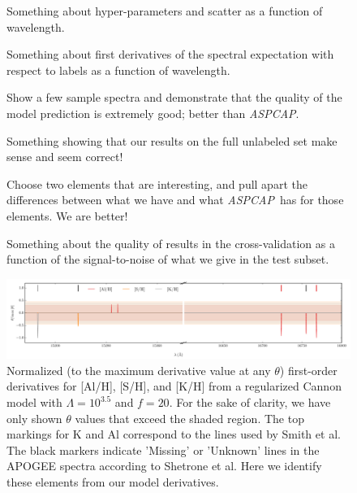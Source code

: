 \documentclass[12pt,preprint]{aastex}
\newcommand{\project}[1]{\textsl{#1}}
\newcommand{\acronym}[1]{{\small{#1}}}
\newcommand{\aspcap}{\project{\acronym{ASPCAP}}}
\begin{document}
\begin{figure}[p]
\caption{Something about hyper-parameters and scatter as a function of
  wavelength.\label{fig:hyperpars}}
\end{figure}

\begin{figure}[p]
\caption{Something about first derivatives of the spectral expectation
  with respect to labels as a function of
  wavelength.\label{fig:derivatives}}
\end{figure}

\begin{figure}[p]
\caption{Show a few sample spectra and demonstrate that the quality of
  the model prediction is extremely good; better than
  \aspcap.\label{fig:correctness}}
\end{figure}

\begin{figure}[p]
\caption{Something showing that our results on the full unlabeled set
  make sense and seem correct!\label{fig:fulltest}}
\end{figure}

\begin{figure}[p]
\caption{Choose two elements that are interesting, and pull apart the
  differences between what we have and what \aspcap\ has for those
  elements.  We are better!\label{fig:elements}}
\end{figure}

\begin{figure}[p]
\caption{Something about the quality of results in the
  cross-validation as a function of the signal-to-noise of what we
  give in the test subset.\label{fig:snr}}
\end{figure}


\begin{figure}[p]
\includegraphics[width=\textwidth]{sparse-first-order-coefficients.pdf}
\caption{Normalized (to the maximum derivative value at any $\theta$) first-order derivatives for [Al/H], [S/H], and [K/H] from a regularized Cannon model with $\Lambda = 10^{3.5}$ and $f = 20$. For the sake of clarity, we have only shown $\theta$ values that exceed the shaded region. The top markings for K and Al correspond to the lines used by Smith et al. The black markers indicate 'Missing' or 'Unknown' lines in the APOGEE spectra according to Shetrone et al. Here we identify these elements from our model derivatives.  \label{fig:inferring-lines}}
\end{figure}
\end{document}
